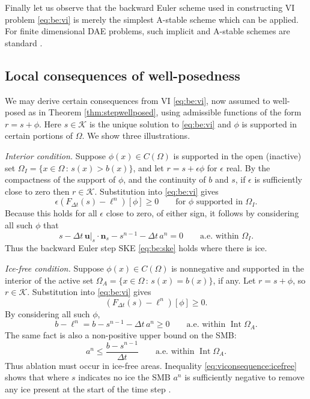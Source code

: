 \documentclass[hidelinks,onefignum,onetabnum,final]{siamart220329}  %
\newcommand{\eps}{\epsilon}
\newcommand{\bn}{\mathbf{n}}
\newcommand{\bu}{\mathbf{u}}
\newcommand{\cK}{\mathcal{K}}
\begin{document}
Finally let us observe that the backward Euler scheme used in constructing VI problem \eqref{eq:be:vi} is merely the simplest A-stable \cite{AscherPetzold1998} scheme which can be applied.  For finite dimensional DAE problems, such implicit and A-stable schemes are standard \cite{AscherPetzold1998}.

\subsection{Local consequences of well-posedness} \label{subsec:viconsequences}  We may derive certain consequences from VI \eqref{eq:be:vi}, now assumed to well-posed as in Theorem \ref{thm:stepwellposed}, using admissible functions of the form $r=s+\phi$.  Here $s \in \cK$ is the unique solution to \eqref{eq:be:vi} and $\phi$ is supported in certain portions of $\Omega$.  We show three illustrations.

\smallskip
\emph{Interior condition.}  Suppose $\phi(x) \in C(\Omega)$ is supported in the open (inactive) set $\Omega_I=\{x\in\Omega\,:\,s(x)>b(x)\}$, and let $r=s+\eps\phi$ for $\eps$ real.  By the compactness of the support of $\phi$, and the continuity of $b$ and $s$, if $\eps$ is sufficiently close to zero then $r\in\cK$.  Substitution into \eqref{eq:be:vi} gives
\begin{equation}
\eps\left(F_{\Delta t}(s) - \ell^n\right)[\phi] \ge 0 \qquad \text{for $\phi$ supported in $\Omega_I$.}
\end{equation}
Because this holds for all $\eps$ close to zero, of either sign, it follows by considering all such $\phi$ that
\begin{equation}
s - \Delta t\, \bu|_s \cdot \bn_s - s^{n-1} - \Delta t\,a^n = 0 \qquad \text{a.e.~within } \Omega_I.
\end{equation}
Thus the backward Euler step SKE \eqref{eq:be:ske} holds where there is ice.

\smallskip
\emph{Ice-free condition.}  Suppose $\phi(x) \in C(\Omega)$ is nonnegative and supported in the interior of the active set $\Omega_A=\{x\in\Omega\,:\,s(x)=b(x)\}$, if any.  Let $r=s+\phi$, so $r\in\cK$.  Substitution into \eqref{eq:be:vi} gives
\begin{equation}
\left(F_{\Delta t}(s) - \ell^n\right)[\phi] \ge 0.
\end{equation}
By considering all such $\phi$,
\begin{equation}
b-\ell^n = b - s^{n-1} - \Delta t\,a^n \ge 0 \qquad \text{a.e.~within } \operatorname{Int}\Omega_A.
\end{equation}
The same fact is also a non-positive upper bound on the SMB:
\begin{equation}
a^n \le \frac{b - s^{n-1}}{\Delta t} \qquad \text{a.e.~within } \operatorname{Int}\Omega_A. \label{eq:viconsequence:icefree}
\end{equation}
Thus ablation must occur in ice-free areas.  Inequality \eqref{eq:viconsequence:icefree} shows that where $s$ indicates no ice the SMB $a^n$ is sufficiently negative to remove any ice present at the start of the time step \cite{Bueler2021conservation}.
\end{document}
